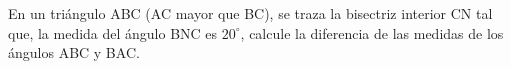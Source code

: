En un triángulo ABC (AC mayor que BC), se traza la bisectriz interior CN tal que, la medida del ángulo BNC es $20^{\circ}$, calcule la diferencia de las medidas de los ángulos ABC y BAC.





